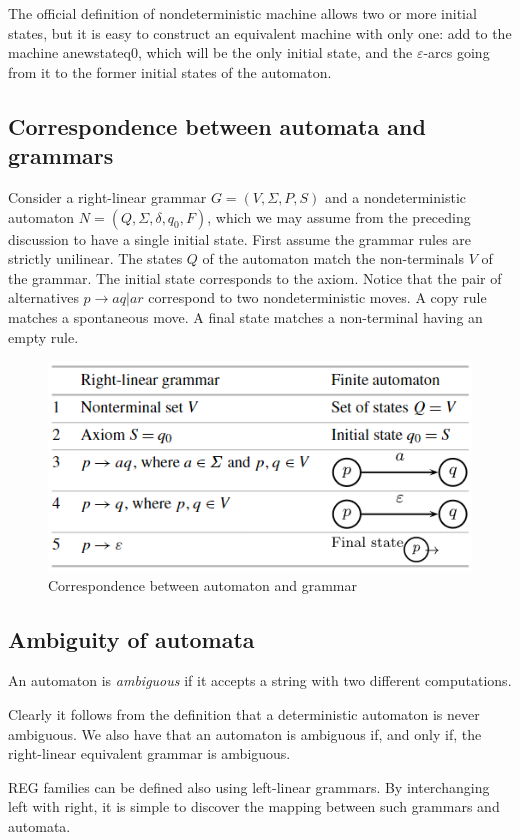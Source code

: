 The official definition of nondeterministic machine allows two or more initial states, but it is easy to construct an equivalent machine with only one: add to the
machine anewstateq0, which will be the only initial state, and the $\varepsilon$-arcs going from it to the former initial states of the automaton.

\subsection*{Correspondence between automata and grammars}
Consider a right-linear grammar $G=(V,\Sigma,P,S)$ and a nondeterministic automaton $N=(Q,\Sigma,\delta,q_0,F)$, which we may assume from the preceding discussion to 
have a single initial state. First assume the grammar rules are strictly unilinear. The states $Q$ of the automaton match the non-terminals $V$ of the grammar. The 
initial state corresponds to the axiom. Notice that the pair of alternatives $p\rightarrow aq|ar$ correspond to two nondeterministic moves. A copy rule matches a 
spontaneous move. A final state  matches a non-terminal having an empty rule.
\begin{figure}[H]
    \centering
    \includegraphics[width=0.75\linewidth]{images/correspondence.png}
    \caption{Correspondence between automaton and grammar}
\end{figure}

\subsection*{Ambiguity of automata}
\begin{definition}
    An automaton is \emph{ambiguous} if it accepts a string with two different computations.
\end{definition}
Clearly it follows from the definition that a deterministic automaton is never ambiguous. We also have that an automaton is ambiguous if, and only if, the right-linear 
equivalent grammar is ambiguous. 

REG families can be defined also using left-linear grammars. By interchanging left with right, it is simple to discover the mapping between such grammars and automata.